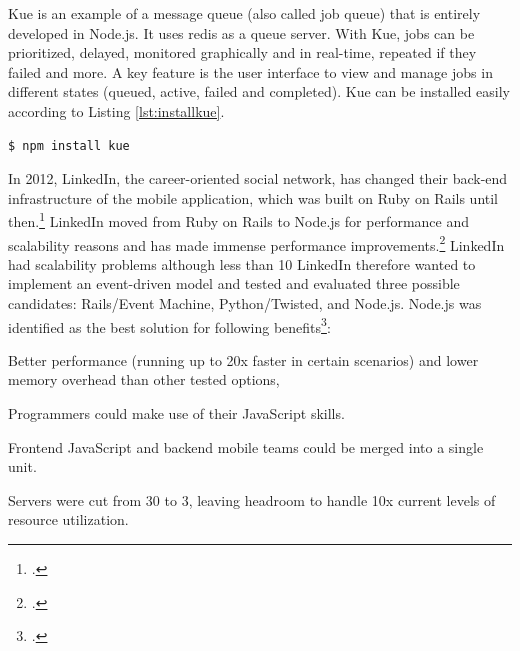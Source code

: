 \begin{appendices}
\begin{subappendices}
Kue is an example of a message queue (also called job queue) that is entirely developed in Node.js. It uses redis as a queue server. With Kue, jobs can be prioritized, delayed, monitored graphically and in real-time, repeated if they failed and more. A key feature is the user interface to view and manage jobs in different states (queued, active, failed and completed). Kue can be installed easily according to Listing \ref{lst:installkue}.

\begin{lstlisting}[language=javascript,caption={Installing Kue via command-line},label=lst:installkue]
$ npm install kue 
\end{lstlisting}

In 2012, LinkedIn, the career-oriented social network, has changed their back-end infrastructure of the mobile application, which was built on Ruby on Rails until then.\footcite[Cf.][]{Avram_2012} LinkedIn moved from Ruby on Rails to Node.js for performance and scalability reasons and has made immense performance improvements.\footcite[Cf.][]{ODell_2011} 
LinkedIn had scalability problems although less than 10%
LinkedIn therefore wanted to implement an event-driven model and tested and evaluated three possible candidates: Rails/Event Machine, Python/Twisted, and Node.js.
Node.js was identified as the best solution for following benefits\footcite[Cf.][]{Avram_2012}:
\begin{description}
  \item Better performance (running up to 20x faster in certain scenarios) and lower memory overhead than other tested options, 
  \item Programmers could make use of their JavaScript skills. 
  \item Frontend JavaScript and backend mobile teams could be merged into a single unit. 
  \item Servers were cut from 30 to 3, leaving headroom to handle 10x current levels of resource utilization.
\end{description}



\end{subappendices}
\end{appendices}
